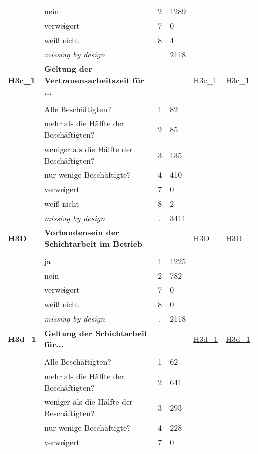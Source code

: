 \begin{longtable}{| L{2.45cm} | L{6cm} | C{1.5cm} | R{1cm} | C{2.25cm} | C{2.25cm} |}
   & nein & 2 & 1289 &  &  \\ 
   & verweigert & 7 & 0 &  &  \\ 
   & weiß nicht & 8 & 4 &  &  \\ 
   & \textit{missing by design} & \textit{.} & 2118 &  &  \\ 
   \midrule
\textbf{H3c\_1}\label{var:H3c:1} & \textbf{Geltung der Vertrauensarbeitszeit für ...} &  &  & \hyperref[H3c:1]{H3c\_1} & \hyperref[var:suf:H3c:1]{H3c\_1} \\ 
   &  &  &  &  &  \\ 
   & Alle Beschäftigten? & 1 & 82 &  &  \\ 
   & mehr als die Hälfte der Beschäftigten? & 2 & 85 &  &  \\ 
   & weniger als die Hälfte der Beschäftigten? & 3 & 135 &  &  \\ 
   & nur wenige Beschäftigte? & 4 & 410 &  &  \\ 
   & verweigert & 7 & 0 &  &  \\ 
   & weiß nicht & 8 & 2 &  &  \\ 
   & \textit{missing by design} & \textit{.} & 3411 &  &  \\ 
   \midrule
\textbf{H3D}\label{var:H3D} & \textbf{Vorhandensein der Schichtarbeit im Betrieb} &  &  & \hyperref[H3D]{H3D} & \hyperref[var:suf:H3D]{H3D} \\ 
   &  &  &  &  &  \\ 
   & ja & 1 & 1225 &  &  \\ 
   & nein & 2 & 782 &  &  \\ 
   & verweigert & 7 & 0 &  &  \\ 
   & weiß nicht & 8 & 0 &  &  \\ 
   & \textit{missing by design} & \textit{.} & 2118 &  &  \\ 
   \midrule
\textbf{H3d\_1}\label{var:H3d:1} & \textbf{Geltung der Schichtarbeit für...} &  &  & \hyperref[H3d:1]{H3d\_1} & \hyperref[var:suf:H3d:1]{H3d\_1} \\ 
   &  &  &  &  &  \\ 
   & Alle Beschäftigten? & 1 & 62 &  &  \\ 
   & mehr als die Hälfte der Beschäftigten? & 2 & 641 &  &  \\ 
   & weniger als die Hälfte der Beschäftigten? & 3 & 293 &  &  \\ 
   & nur wenige Beschäftigte? & 4 & 228 &  &  \\ 
   & verweigert & 7 & 0 &  &  \\ 

\end{longtable}
